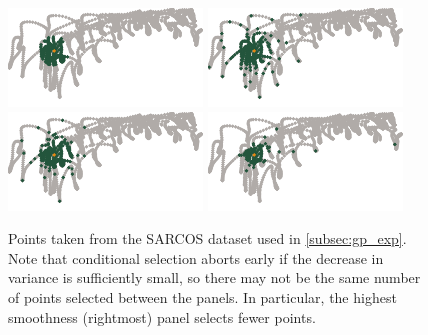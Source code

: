 \documentclass[review,supplement,onefignum,onetabnum]{siamonline220329}
\begin{document}
\begin{figure}[H]
  \centering
  \includegraphics{figures/precompiled/sarcos1/points_1.pdf}%
  \quad
  \includegraphics{figures/precompiled/sarcos1/points_2.pdf}%
  \quad
  \includegraphics{figures/precompiled/sarcos1/points_3.pdf}%
  \quad
  \includegraphics{figures/precompiled/sarcos1/points_4.pdf}%
  \caption{%
    Points taken from the SARCOS dataset used in \cref{subsec:gp_exp}.
    Note that conditional selection aborts early if the decrease in
    variance is sufficiently small, so there may not be the same number
    of points selected between the panels. In particular, the highest
    smoothness (rightmost) panel selects fewer points.
  }
\end{figure}
\end{document}
